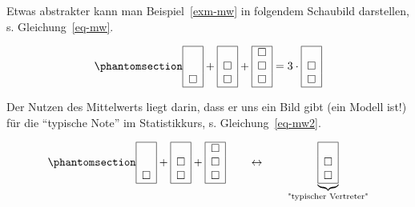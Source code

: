 \documentclass[
  letterpaper,
]{scrbook}
\theoremstyle{definition}
\theoremstyle{definition}
\theoremstyle{definition}
\theoremstyle{remark}
\begin{document}
Etwas abstrakter kann man Beispiel~\ref{exm-mw} in folgendem Schaubild
darstellen, s. Gleichung~\ref{eq-mw}.

\begin{equation}\phantomsection\label{eq-mw}{
\begin{array}{|c|} \hline \\ \\ \square \\ \hline \end{array} + \begin{array}{|c|} \hline \\ \square \\ \square \\ \hline \end{array} + \begin{array}{|c|} \hline \square \\ \square \\ \square \\ \hline \end{array} = 3 \cdot \begin{array}{|c|} \hline \\ \square \\ \square \\ \hline \end{array}
}\end{equation}

Der Nutzen des Mittelwerts liegt darin, dass er uns ein Bild gibt (ein
Modell ist!) für die ``typische Note'' im Statistikkurs, s.
Gleichung~\ref{eq-mw2}.

\begin{equation}\phantomsection\label{eq-mw2}{\begin{array}{|c|} \hline \\ \\ \square \\ \hline \end{array} + \begin{array}{|c|} \hline \\ \square \\ \square \\ \hline \end{array} + \begin{array}{|c|} \hline \square \\ \square \\ \square \\ \hline \end{array} \qquad \leftrightarrow  \qquad \underbrace{\begin{array}{|c|} \hline \\ \square \\ \square \\ \hline \end{array}}_{\text{"typischer Vertreter"}}}\end{equation}
\end{document}
